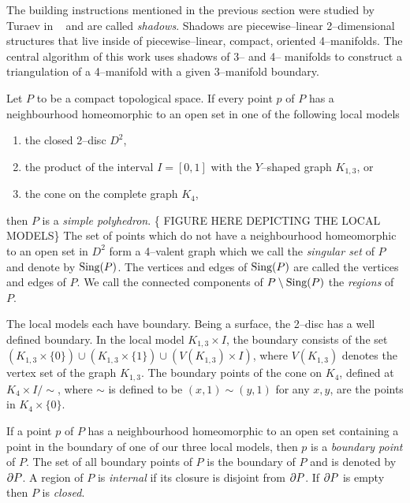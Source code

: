 \label{sec:shadow}

The building instructions mentioned in the previous section were studied by Turaev in ~\cite{Turaev91} and are called \emph{shadows}.
Shadows are piecewise--linear 2--dimensional structures that live inside of piecewise--linear, compact, oriented 4--manifolds.
The central algorithm of this work uses shadows of 3-- and 4-- manifolds to construct a triangulation of a 4--manifold with a given 3--manifold boundary.

\begin{defn}
  Let $P$ to be a compact topological space.
  If every point $p$ of $P$ has a neighbourhood homeomorphic to an open set in one of the following local models
  \begin{enumerate}
    \item the closed 2--disc $D^2$,
    \item the product of the interval $I=[0,1]$ with the $Y$--shaped graph $K_{1,3}$, or
    \item the cone on the complete graph $K_4$,
  \end{enumerate}
  then $P$ is a \emph{simple polyhedron}.
  \{ FIGURE HERE DEPICTING THE LOCAL MODELS\}
  The set of points which do not have a neighbourhood homeomorphic to an open set in $D^2$ form a 4--valent graph which we call the \emph{singular set} of $P$ and denote by $\textrm{Sing} (P)$.
  The vertices and edges of $\textrm{Sing} (P)$ are called the vertices and edges of $P$.
  We call the connected components of $P\setminus\textrm{Sing} (P)$ the \emph{regions} of $P$.
  
  The local models each have boundary.
  Being a surface, the 2--disc has a well defined boundary.
  In the local model $K_{1,3}\times I$, the boundary consists of the set $(K_{1,3}\times \{0\})\cup (K_{1,3}\times \{1\})\cup (V(K_{1,3})\times I)$, where $V(K_{1,3})$ denotes the vertex set of the graph $K_{1,3}$.
  The boundary points of the cone on $K_4$, defined at $K_4\times I /\sim$, where $\sim$ is defined to be $(x,1)\sim (y,1)$ for any $x,y$, are the points in $K_4\times \{0\}$.
  
  If a point $p$ of $P$ has a neighbourhood homeomorphic to an open set containing a point in the boundary of one of our three local models, then $p$ is a \emph{boundary point} of $P$.
  The set of all boundary points of $P$ is the boundary of $P$ and is denoted by $\partial P$.
  A region of $P$ is \emph{internal} if its closure is disjoint from $\partial P$.
  If $\partial P$ is empty then $P$ is \emph{closed}.
\end{defn}

